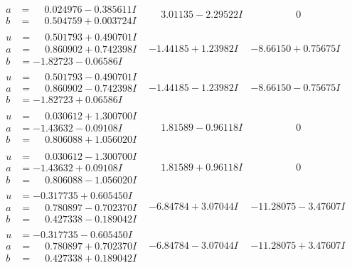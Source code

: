 \documentclass[1p]{elsarticle_modified}
\theoremstyle{definition}
\begin{document}
$$\begin{array}{c|c|c}
\begin{aligned}
a &= \phantom{-}0.024976 - 0.385611 I \\
b &= \phantom{-}0.504759 + 0.003724 I\end{aligned}
 & \phantom{-}3.01135 - 2.29522 I & \phantom{-0.000000 } 0 \\ \hline\begin{aligned}
u &= \phantom{-}0.501793 + 0.490701 I \\
a &= \phantom{-}0.860902 + 0.742398 I \\
b &= -1.82723 - 0.06586 I\end{aligned}
 & -1.44185 + 1.23982 I & -8.66150 + 0.75675 I \\ \hline\begin{aligned}
u &= \phantom{-}0.501793 - 0.490701 I \\
a &= \phantom{-}0.860902 - 0.742398 I \\
b &= -1.82723 + 0.06586 I\end{aligned}
 & -1.44185 - 1.23982 I & -8.66150 - 0.75675 I \\ \hline\begin{aligned}
u &= \phantom{-}0.030612 + 1.300700 I \\
a &= -1.43632 - 0.09108 I \\
b &= \phantom{-}0.806088 + 1.056020 I\end{aligned}
 & \phantom{-}1.81589 - 0.96118 I & \phantom{-0.000000 } 0 \\ \hline\begin{aligned}
u &= \phantom{-}0.030612 - 1.300700 I \\
a &= -1.43632 + 0.09108 I \\
b &= \phantom{-}0.806088 - 1.056020 I\end{aligned}
 & \phantom{-}1.81589 + 0.96118 I & \phantom{-0.000000 } 0 \\ \hline\begin{aligned}
u &= -0.317735 + 0.605450 I \\
a &= \phantom{-}0.780897 - 0.702370 I \\
b &= \phantom{-}0.427338 - 0.189042 I\end{aligned}
 & -6.84784 + 3.07044 I & -11.28075 - 3.47607 I \\ \hline\begin{aligned}
u &= -0.317735 - 0.605450 I \\
a &= \phantom{-}0.780897 + 0.702370 I \\
b &= \phantom{-}0.427338 + 0.189042 I\end{aligned}
 & -6.84784 - 3.07044 I & -11.28075 + 3.47607 I \\ \hline\begin{aligned}

\end{aligned}
\end{array}$$
\end{document}
